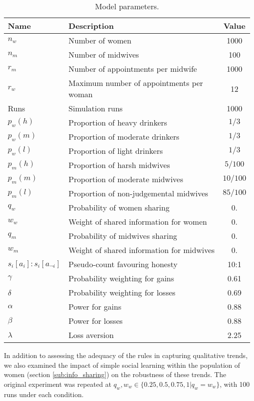 \begin{table}[h!]
\center
\begin{tabular} {|l | l | c|}
\hline
Name & Description & Value \\ \hline
\(n_{w}\) & Number of women & 1000 \\ \hline
\(n_{m}\) & Number of midwives & 100 \\ \hline
\(r_{m}\) & Number of appointments per midwife & 1000 \\ \hline
\(r_{w}\) & Maximum number of appointments per woman & 12 \\ \hline
Runs & Simulation runs & 1000 \\ \hline
\(p_{w}(h)\) & Proportion of heavy drinkers & \(1/3\) \\ \hline
\(p_{w}(m)\) & Proportion of moderate drinkers & \(1/3\) \\ \hline
\(p_{w}(l)\) & Proportion of light drinkers & \(1/3\) \\ \hline
\(p_{m}(h)\) & Proportion of harsh midwives & \(5/100\) \\ \hline
\(p_{m}(m)\) & Proportion of moderate midwives & \(10/100\) \\ \hline
\(p_{m}(l)\) & Proportion of non-judgemental midwives & \(85/100\) \\ \hline
\(q_{w}\) & Probability of women sharing & 0. \\ \hline
\(w_{w}\) & Weight of shared information for women & 0. \\ \hline
\(q_{m}\) & Probability of midwives sharing & 0. \\ \hline
\(w_{m}\) & Weight of shared information for midwives & 0. \\ \hline
\(s_{i}[a_{i}]:s_{i}[a_{\neg i}]\) & Pseudo-count favouring honesty & 10:1 \\ \hline
\(\gamma\) & Probability weighting for gains  & 0.61 \\ \hline
\(\delta\) & Probability weighting for losses &  0.69\\ \hline
\(\alpha\) & Power for gains  & 0.88 \\ \hline
\(\beta\) & Power for losses & 0.88 \\ \hline
\(\lambda\) & Loss aversion &  2.25 \\ \hline
\end{tabular}
\caption{Model parameters. \label{tab:qt_params}}
\end{table}


In addition to assessing the adequacy of the rules in capturing qualitative trends, we also examined the impact of simple social learning within the population of women (section \ref{sub:info_sharing}) on the robustness of these trends. The original experiment was repeated at \(q_{w},w_{w}\in \{0.25, 0.5, 0.75, 1 | q_{w}=w_{w}\}\), with 100 runs under each condition. 

